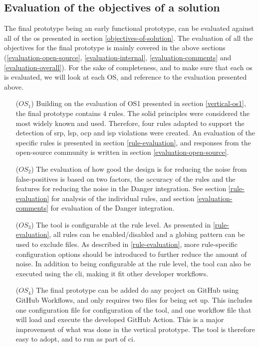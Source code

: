 \documentclass[pdftex,10pt,b5paper,twoside]{report}
\begin{document}
\subsection{Evaluation of the objectives of a solution}

The final prototype being an early functional prototype, can be evaluated against all of the \gls{os} presented in section \ref{objectives-of-solution}. The evaluation of all the objectives for the final prototype is mainly covered in the above sections (\ref{evaluation-open-source}, \ref{evaluation-internal}, \ref{evaluation-comments} and \ref{evaluation-overall}). For the sake of completeness, and to make sure that each \gls{os} is evaluated, we will look at each OS, and reference to the evaluation presented above. 



\begin{itemize}
    \item [(\(OS_{1}\))] Building on the evaluation of OS1 presented in section \ref{vertical-os1}, the final prototype contains 4 rules. The \gls{solid} principles were considered the most widely known and used. Therefore, four rules adapted to support the detection of \gls{srp}, \gls{lsp}, \gls{ocp} and \gls{isp} violations were created. An evaluation of the specific rules is presented in section \ref{rule-evaluation}, and responses from the open-source community is written in section \ref{evaluation-open-source}.
    
    \item [(\(OS_{2}\))] The evaluation of how good the design is for reducing the noise from false-positives is based on two factors, the accuracy of the rules and the features for reducing the noise in the Danger integration. See section \ref{rule-evaluation} for analysis of the individual rules, and section \ref{evaluation-comments} for evaluation of the Danger integration. 
    
    \item [(\(OS_{3}\))] The tool is configurable at the rule level. As presented in \ref{rule-evaluation}, all rules can be enabled/disabled and a globing pattern can be used to exclude files. As described in \ref{rule-evaluation}, more rule-specific configuration options should be introduced to further reduce the amount of noise. In addition to being configurable at the rule level, the tool can also be executed using the \gls{cli}, making it fit other developer workflows. 
    
    \item [(\(OS_{4}\))] The final prototype can be added do any project on GitHub using GitHub Workflows, and only requires two files for being set up. This includes one configuration file for configuration of the tool, and one workflow file that will load and execute the developed GitHub Action. This is a major improvement of what was done in the vertical prototype. The tool is therefore easy to adopt, and to run as part of \gls{ci}.

\end{itemize}
\end{document}
